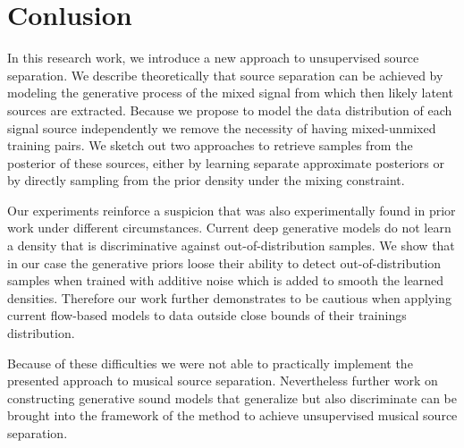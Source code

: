 \chapter{Conlusion}
In this research work, we introduce a new approach to unsupervised source separation. We describe theoretically that source separation can be achieved by modeling the generative process of the mixed signal from which then likely latent sources are extracted. Because we propose to model the data distribution of each signal source independently we remove the necessity of having mixed-unmixed training pairs. We sketch out two approaches to retrieve samples from the posterior of these sources, either by learning separate approximate posteriors or by directly sampling from the prior density under the mixing constraint.

Our experiments reinforce a suspicion that was also experimentally found in prior work under different circumstances. Current deep generative models do not learn a density that is discriminative against out-of-distribution samples. We show that in our case the generative priors loose their ability to detect out-of-distribution samples when trained with additive noise which is added to smooth the learned densities. Therefore our work further demonstrates to be cautious when applying current flow-based models to data outside close bounds of their trainings distribution.

Because of these difficulties we were not able to practically implement the presented approach to musical source separation. Nevertheless further work on constructing generative sound models that generalize but also discriminate can be brought into the framework of the method to achieve unsupervised musical source separation.
